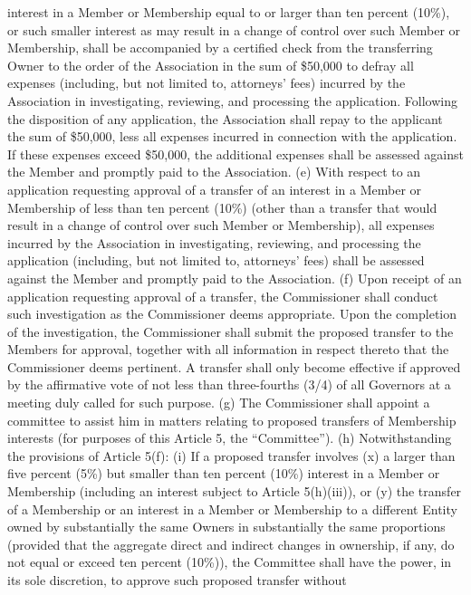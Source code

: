 \documentclass[]{book}
\theoremstyle{definition}
\theoremstyle{definition}
\theoremstyle{definition}
\theoremstyle{remark}
\begin{document}
interest in a Member or Membership equal to or larger than ten percent
(10\%), or such smaller interest as may result in a change of control
over such Member or Membership, shall be accompanied by a certified
check from the transferring Owner to the order of the Association in the
sum of \$50,000 to defray all expenses (including, but not limited to,
attorneys' fees) incurred by the Association in investigating,
reviewing, and processing the application. Following the disposition of
any application, the Association shall repay to the applicant the sum of
\$50,000, less all expenses incurred in connection with the application.
If these expenses exceed \$50,000, the additional expenses shall be
assessed against the Member and promptly paid to the Association. (e)
With respect to an application requesting approval of a transfer of an
interest in a Member or Membership of less than ten percent (10\%)
(other than a transfer that would result in a change of control over
such Member or Membership), all expenses incurred by the Association in
investigating, reviewing, and processing the application (including, but
not limited to, attorneys' fees) shall be assessed against the Member
and promptly paid to the Association. (f) Upon receipt of an application
requesting approval of a transfer, the Commissioner shall conduct such
investigation as the Commissioner deems appropriate. Upon the completion
of the investigation, the Commissioner shall submit the proposed
transfer to the Members for approval, together with all information in
respect thereto that the Commissioner deems pertinent. A transfer shall
only become effective if approved by the affirmative vote of not less
than three-fourths (3/4) of all Governors at a meeting duly called for
such purpose. (g) The Commissioner shall appoint a committee to assist
him in matters relating to proposed transfers of Membership interests
(for purposes of this Article 5, the ``Committee''). (h) Notwithstanding
the provisions of Article 5(f): (i) If a proposed transfer involves (x)
a larger than five percent (5\%) but smaller than ten percent (10\%)
interest in a Member or Membership (including an interest subject to
Article 5(h)(iii)), or (y) the transfer of a Membership or an interest
in a Member or Membership to a different Entity owned by substantially
the same Owners in substantially the same proportions (provided that the
aggregate direct and indirect changes in ownership, if any, do not equal
or exceed ten percent (10\%)), the Committee shall have the power, in
its sole discretion, to approve such proposed transfer without
\end{document}
